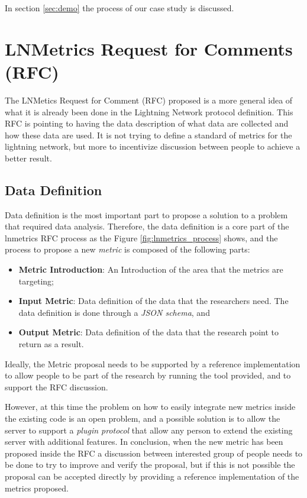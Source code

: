 In section \ref{sec:demo} the process of our case study is discussed.

\section{LNMetrics Request for Comments (RFC)}

The LNMetics Request for Comment (RFC) proposed is a more general idea of what 
it is already been done in the Lightning Network protocol definition. 
This RFC is pointing to having the data description of what data are collected 
and how these data are used. It is not trying to define a 
standard of metrics for the lightning network, 
but more to incentivize discussion between people to achieve a better result.

\subsection{Data Definition}

Data definition is the most important part to propose a solution to a problem 
that required data analysis. Therefore, the data definition is a core 
part of the lnmetrics RFC process as the Figure \ref{fig:lnmetrics_process}
shows, and the process to propose a new \emph{metric} is composed of 
the following parts:

\begin{itemize}
    \item {\bf Metric Introduction}: An Introduction of the area that the metrics are targeting;
    \item {\bf Input Metric}: Data definition of the data that the researchers need. The data definition is done through a \emph{JSON schema}, and
    \item {\bf Output Metric}: Data definition of the data that the research point to return as a result. 
\end{itemize}

Ideally, the Metric proposal needs to be supported by a reference implementation to 
allow people to be part of the research by running the tool provided, and 
to support the RFC discussion.

However, at this time the problem on how to easily integrate new metrics inside the 
existing code is an open problem, and a possible solution is to allow the server 
to support a \emph{plugin protocol} that allow any person to extend the existing 
server with additional features.
In conclusion, when the new metric has been proposed inside the RFC a discussion between interested 
group of people needs to be done to try to improve and verify the proposal, but if this is not possible
the proposal can be accepted directly by providing a reference implementation of the metrics proposed.


